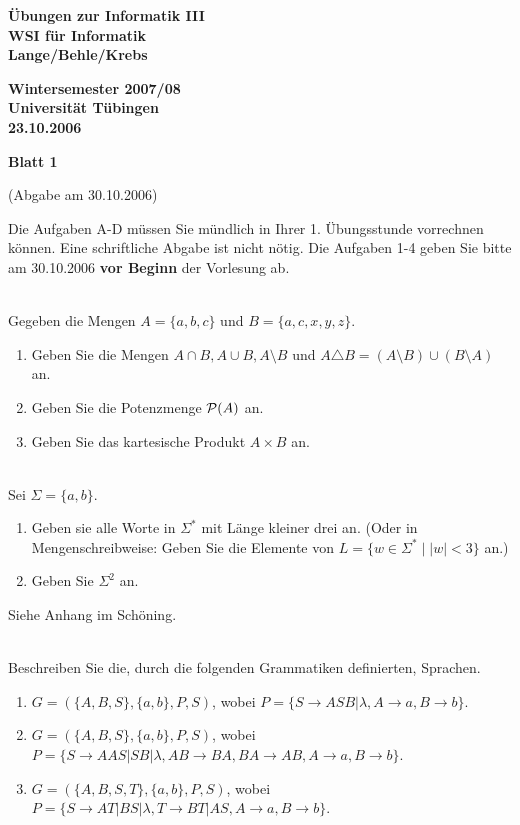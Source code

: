 \documentclass[a4paper]{article}
\def\header#1#2#3{\pagestyle{empty}
\noindent
\begin{minipage}[t]{0.6\textwidth}
\begin{flushleft}
\bf \"Ubungen zur Informatik III\\
WSI f\"ur Informatik\\
Lange/Behle/Krebs
\end{flushleft}
\end{minipage}
\begin{minipage}[t]{0.4\textwidth}
\begin{flushright}
\bf Wintersemester 2007/08\\
Universit\"at T\"ubingen\\
#2 %
\end{flushright}
\end{minipage}

\begin{center}
{\Large\bf Blatt #1}

{(Abgabe am #3)}
\end{center}
}
\begin{document}
\header{1}{23.10.2006}{30.10.2006}


\bigskip

Die Aufgaben A-D m\"ussen Sie m\"undlich in Ihrer 1. \"Ubungsstunde vorrechnen k\"onnen. Eine schriftliche Abgabe ist nicht n\"otig.
Die Aufgaben 1-4 geben Sie bitte am 30.10.2006 {\bf vor Beginn} der Vorlesung ab.

\bigskip

\\
Gegeben die Mengen $A = \{a,b,c\}$ und $B = \{a,c,x,y,z\}$.
\begin{enumerate}
\item Geben Sie die Mengen $A\cap B, A\cup B, A\setminus B$ und
$A \triangle B=(A\setminus B) \cup (B\setminus A)$ an.
\item Geben Sie die Potenzmenge ${\cal P}(A)$ an.
\item Geben Sie das kartesische Produkt $A\times B$ an.
\end{enumerate}

\bigskip

\\
Sei $\Sigma=\{a,b\}$.
\begin{enumerate}
\item Geben sie alle Worte in $\Sigma^*$ mit L\"ange kleiner drei an.
(Oder in Mengenschreibweise: Geben Sie die Elemente von $L=\{w\in\Sigma^*\mid |w|<3\}$ an.)
\item Geben Sie $\Sigma^2$ an.
\end{enumerate}
Siehe Anhang im Sch\"oning.

\bigskip

\\
Beschreiben Sie die, durch die folgenden Grammatiken definierten, Sprachen.
\begin{enumerate}
\item $G=(\{A,B,S\},\{a,b\}, P, S)$, wobei $P=\{S\rightarrow ASB|\lambda, A\rightarrow a, B\rightarrow b\}$.
\item $G=(\{A,B,S\},\{a,b\}, P, S)$, wobei $P=\{S\rightarrow AAS|SB|\lambda, AB\rightarrow BA,BA\rightarrow AB, A\rightarrow a, B\rightarrow b\}$.
\item $G=(\{A,B,S,T\},\{a,b\}, P, S)$, wobei $P=\{S\rightarrow AT|BS|\lambda,T\rightarrow BT|AS , A\rightarrow a, B\rightarrow b\}$.
\end{enumerate}

\bigskip
\end{document}
